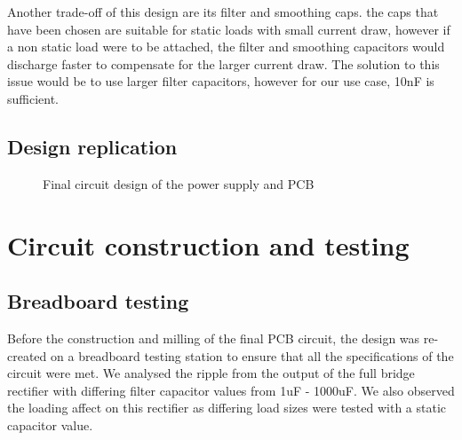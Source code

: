 \documentclass[a4paper,11pt]{article}
\begin{document}
Another trade-off of this design are its filter and smoothing caps. the caps that have been chosen are suitable for static loads with small current draw, however if a non static load were to be attached, the filter and smoothing capacitors would discharge faster to compensate for the larger current draw. The solution to this issue would be to use larger filter capacitors, however for our use case, 10nF is sufficient. 

\subsection{Design replication}

\begin{figure}[h]
\hspace{-23pt}
  \caption{Final circuit design of the power supply and PCB}

\end{figure}
\pagebreak

\section{Circuit construction and testing}

\subsection{Breadboard testing}

Before the construction and milling of the final PCB circuit, the design was re-created on a breadboard testing station to ensure that all the specifications of the circuit were met. We analysed the ripple from the output of the full bridge rectifier with differing filter capacitor values from 1uF - 1000uF. We also observed the loading affect on this rectifier as differing load sizes were tested with a static capacitor value.
\end{document}
